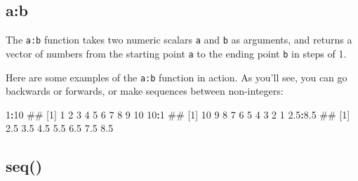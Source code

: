 \documentclass[]{book}
\newenvironment{Shaded}{\begin{snugshade}}{\end{snugshade}}
\newcommand{\DecValTok}[1]{\textcolor[rgb]{0.00,0.00,0.81}{#1}}
\newcommand{\FloatTok}[1]{\textcolor[rgb]{0.00,0.00,0.81}{#1}}
\newcommand{\OperatorTok}[1]{\textcolor[rgb]{0.81,0.36,0.00}{\textbf{#1}}}
\newcommand{\NormalTok}[1]{#1}
\theoremstyle{definition}
\theoremstyle{definition}
\theoremstyle{remark}
\begin{document}
\subsection{a:b}\label{ab}

The \texttt{a:b} function takes two numeric scalars \texttt{a} and
\texttt{b} as arguments, and returns a vector of numbers from the
starting point \texttt{a} to the ending point \texttt{b} in steps of 1.

Here are some examples of the \texttt{a:b} function in action. As you'll
see, you can go backwards or forwards, or make sequences between
non-integers:

\begin{Shaded}
\begin{Highlighting}[]
\DecValTok{1}\OperatorTok{:}\DecValTok{10}
\NormalTok{##  [1]  1  2  3  4  5  6  7  8  9 10}
\DecValTok{10}\OperatorTok{:}\DecValTok{1}
\NormalTok{##  [1] 10  9  8  7  6  5  4  3  2  1}
\FloatTok{2.5}\OperatorTok{:}\FloatTok{8.5}
\NormalTok{## [1] 2.5 3.5 4.5 5.5 6.5 7.5 8.5}
\end{Highlighting}
\end{Shaded}

\subsection{seq()}\label{seq}
\end{document}
